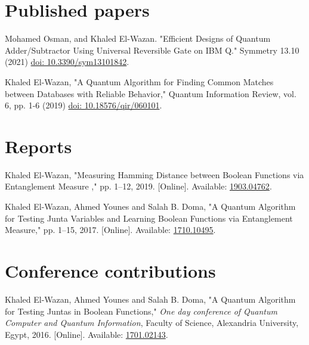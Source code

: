 \documentclass[margin,line,a4paper]{resume}
\newcommand*{\doi}[1]{\href{http://dx.doi.org/#1}{doi: #1}}
\begin{document}
\begin{resume}
\section{ \mysidestyle Published papers}

Mohamed Osman, and Khaled El-Wazan. "Efficient Designs of Quantum Adder/Subtractor Using Universal Reversible Gate on IBM Q." Symmetry 13.10 (2021) \doi{10.3390/sym13101842}.
    
    
Khaled El-Wazan, "A Quantum Algorithm for Finding Common Matches between Databases with Reliable Behavior," Quantum Information Review, vol. 6, pp. 1-6 (2019) \doi{10.18576/qir/060101}.


\section{\mysidestyle Reports}

Khaled El-Wazan, "Measuring Hamming Distance between Boolean Functions via Entanglement Measure ,"  pp. 1--12, 2019. 
[Online]. Available: \href{http://arxiv.org/abs/1903.04762}{1903.04762}.



Khaled El-Wazan, Ahmed Younes and Salah B. Doma, "A Quantum Algorithm for Testing Junta Variables and Learning Boolean Functions via Entanglement Measure,"  pp. 1--15, 2017. 
[Online]. Available: \href{http://arxiv.org/abs/1710.10495}{1710.10495}.



%


\section{ \mysidestyle Conference contributions}


Khaled El-Wazan, Ahmed Younes and Salah B. Doma, "A Quantum Algorithm for Testing Juntas in Boolean Functions," \textit{One day conference of Quantum Computer and Quantum Information}, Faculty of Science, Alexandria University, Egypt, 2016. [Online]. Available: \href{http://arxiv.org/abs/1701.02143}{1701.02143}.


\end{resume}
\end{document}

